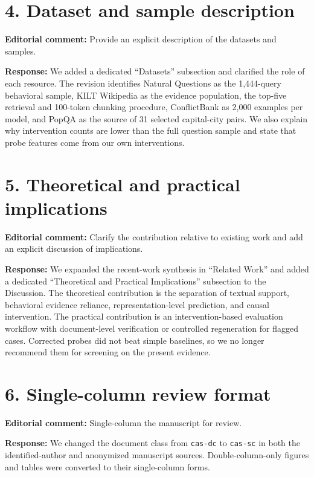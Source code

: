 \documentclass[11pt]{article}
\begin{document}
\section*{4. Dataset and sample description}

\textbf{Editorial comment:} Provide an explicit description of the datasets and samples.

\textbf{Response:} We added a dedicated ``Datasets'' subsection and clarified the role of each resource. The revision identifies Natural Questions as the 1,444-query behavioral sample, KILT Wikipedia as the evidence population, the top-five retrieval and 100-token chunking procedure, ConflictBank as 2,000 examples per model, and PopQA as the source of 31 selected capital-city pairs. We also explain why intervention counts are lower than the full question sample and state that probe features come from our own interventions.

\section*{5. Theoretical and practical implications}

\textbf{Editorial comment:} Clarify the contribution relative to existing work and add an explicit discussion of implications.

\textbf{Response:} We expanded the recent-work synthesis in ``Related Work'' and added a dedicated ``Theoretical and Practical Implications'' subsection to the Discussion. The theoretical contribution is the separation of textual support, behavioral evidence reliance, representation-level prediction, and causal intervention. The practical contribution is an intervention-based evaluation workflow with document-level verification or controlled regeneration for flagged cases. Corrected probes did not beat simple baselines, so we no longer recommend them for screening on the present evidence.

\section*{6. Single-column review format}

\textbf{Editorial comment:} Single-column the manuscript for review.

\textbf{Response:} We changed the document class from \texttt{cas-dc} to \texttt{cas-sc} in both the identified-author and anonymized manuscript sources. Double-column-only figures and tables were converted to their single-column forms.
\end{document}
